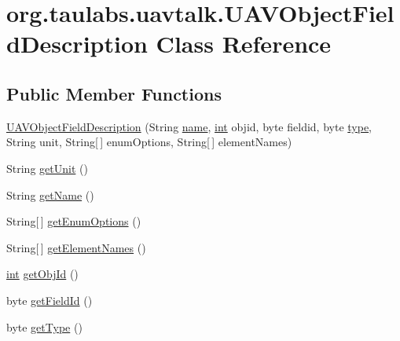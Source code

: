 \hypertarget{classorg_1_1taulabs_1_1uavtalk_1_1_u_a_v_object_field_description}{\section{org.\-taulabs.\-uavtalk.\-U\-A\-V\-Object\-Field\-Description Class Reference}
\label{classorg_1_1taulabs_1_1uavtalk_1_1_u_a_v_object_field_description}
}
\subsection*{Public Member Functions}
\begin{DoxyCompactItemize}
\item 
\hyperlink{classorg_1_1taulabs_1_1uavtalk_1_1_u_a_v_object_field_description_acd6685415a0bcc795e703f93075ff77e}{U\-A\-V\-Object\-Field\-Description} (String \hyperlink{glext_8h_ad977737dfc9a274a62741b9500c49a32}{name}, \hyperlink{ioapi_8h_a787fa3cf048117ba7123753c1e74fcd6}{int} objid, byte fieldid, byte \hyperlink{glext_8h_a7d05960f4f1c1b11f3177dc963a45d86}{type}, String unit, String\mbox{[}$\,$\mbox{]} enum\-Options, String\mbox{[}$\,$\mbox{]} element\-Names)
\item 
String \hyperlink{classorg_1_1taulabs_1_1uavtalk_1_1_u_a_v_object_field_description_ab0a176bfcc40e7641956c39febf2d4a1}{get\-Unit} ()
\item 
String \hyperlink{classorg_1_1taulabs_1_1uavtalk_1_1_u_a_v_object_field_description_a6d0350d0647d69ca5ba3ddfa69d4d7c6}{get\-Name} ()
\item 
String\mbox{[}$\,$\mbox{]} \hyperlink{classorg_1_1taulabs_1_1uavtalk_1_1_u_a_v_object_field_description_ac99b04f1b64f4483043fd4d0c47787d9}{get\-Enum\-Options} ()
\item 
String\mbox{[}$\,$\mbox{]} \hyperlink{classorg_1_1taulabs_1_1uavtalk_1_1_u_a_v_object_field_description_a7e7ce733e940b73c0c0f696f8beefcec}{get\-Element\-Names} ()
\item 
\hyperlink{ioapi_8h_a787fa3cf048117ba7123753c1e74fcd6}{int} \hyperlink{classorg_1_1taulabs_1_1uavtalk_1_1_u_a_v_object_field_description_a9122f158740fd7ed7da44cfd39afac7b}{get\-Obj\-Id} ()
\item 
byte \hyperlink{classorg_1_1taulabs_1_1uavtalk_1_1_u_a_v_object_field_description_add33bd1f915250f43fbabd4804a170c5}{get\-Field\-Id} ()
\item 
byte \hyperlink{classorg_1_1taulabs_1_1uavtalk_1_1_u_a_v_object_field_description_ace90d41125acb4cd6cc8f573264ac755}{get\-Type} ()
\end{DoxyCompactItemize}
